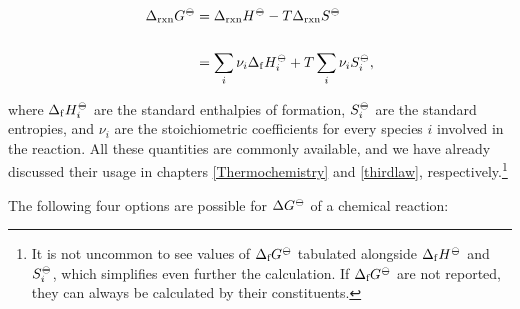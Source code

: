 \documentclass[
]{book}
\theoremstyle{definition}
\theoremstyle{definition}
\theoremstyle{definition}
\theoremstyle{remark}
\begin{document}
\begin{equation}
\begin{aligned}
\Delta_{\text{rxn}} G^{-\kern-6pt{\ominus}\kern-6pt-}&= \Delta_{\text{rxn}} H^{-\kern-6pt{\ominus}\kern-6pt-}-T \Delta_{\text{rxn}} S^{-\kern-6pt{\ominus}\kern-6pt-}\\
\\
&= \sum_i \nu_i \Delta_{\mathrm{f}} H_i^{-\kern-6pt{\ominus}\kern-6pt-}+ T \sum_i \nu_i S_i^{-\kern-6pt{\ominus}\kern-6pt-},
\end{aligned}
\label{eq:gibbseq2}
\end{equation}

where \(\Delta_{\mathrm{f}} H_i^{-\kern-6pt{\ominus}\kern-6pt-}\) are the standard enthalpies of formation, \(S_i^{-\kern-6pt{\ominus}\kern-6pt-}\) are the standard entropies, and \(\nu_i\) are the stoichiometric coefficients for every species \(i\) involved in the reaction. All these quantities are commonly available, and we have already discussed their usage in chapters \ref{Thermochemistry} and \ref{thirdlaw}, respectively.\footnote{It is not uncommon to see values of \(\Delta_{\text{f}} G^{-\kern-6pt{\ominus}\kern-6pt-}\) tabulated alongside \(\Delta_{\mathrm{f}} H^{-\kern-6pt{\ominus}\kern-6pt-}\) and \(S_i^{-\kern-6pt{\ominus}\kern-6pt-}\), which simplifies even further the calculation. If \(\Delta_{\text{f}} G^{-\kern-6pt{\ominus}\kern-6pt-}\) are not reported, they can always be calculated by their constituents.}

The following four options are possible for \(\Delta G^{-\kern-6pt{\ominus}\kern-6pt-}\) of a chemical reaction:
\end{document}

